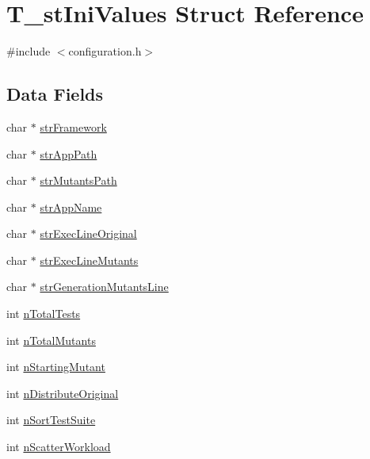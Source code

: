 \hypertarget{structT__stIniValues}{\section{T\-\_\-st\-Ini\-Values Struct Reference}
\label{structT__stIniValues}
}


{\ttfamily \#include $<$configuration.\-h$>$}

\subsection*{Data Fields}
\begin{DoxyCompactItemize}
\item 
char $\ast$ \hyperlink{structT__stIniValues_ab3df825d4e72352403ee7a26433b9072}{str\-Framework}
\item 
char $\ast$ \hyperlink{structT__stIniValues_a96a9cb7f742e9dfb5d31b02365402ef8}{str\-App\-Path}
\item 
char $\ast$ \hyperlink{structT__stIniValues_ac22b85753c96ab5c7e42e276efd510ee}{str\-Mutants\-Path}
\item 
char $\ast$ \hyperlink{structT__stIniValues_a9449590564856539b23091c85e2473a2}{str\-App\-Name}
\item 
char $\ast$ \hyperlink{structT__stIniValues_a46fe9be8dc44b4ffd060a29541166e1c}{str\-Exec\-Line\-Original}
\item 
char $\ast$ \hyperlink{structT__stIniValues_a66c6ac753e7e43108c54653c43c1ab12}{str\-Exec\-Line\-Mutants}
\item 
char $\ast$ \hyperlink{structT__stIniValues_ac1f3e27f18bc3890f76a6603be93d8e5}{str\-Generation\-Mutants\-Line}
\item 
int \hyperlink{structT__stIniValues_ab4cbe3e8751c52a603337080de3fa499}{n\-Total\-Tests}
\item 
int \hyperlink{structT__stIniValues_a975e65fb143fd57b64c41e47a0b78363}{n\-Total\-Mutants}
\item 
int \hyperlink{structT__stIniValues_a7a986b1504100a3dd36231b94bca6fdc}{n\-Starting\-Mutant}
\item 
int \hyperlink{structT__stIniValues_ad4903a48760ca466c9f07d052670f80b}{n\-Distribute\-Original}
\item 
int \hyperlink{structT__stIniValues_a582f96b76a1c3f8f3bda40fb20902121}{n\-Sort\-Test\-Suite}
\item 
int \hyperlink{structT__stIniValues_a2dbfae0f34b401a1694e985f5d77bc1d}{n\-Scatter\-Workload}
\item 

\end{DoxyCompactItemize}
